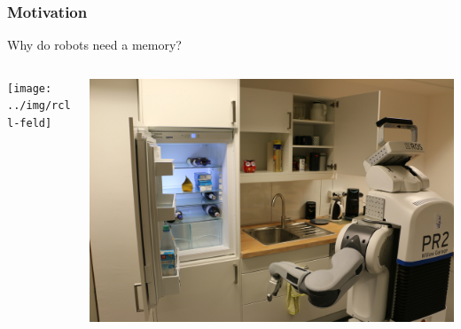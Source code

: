\begin{frame}
  \frametitle{Motivation}
  \Large{Why do robots need a memory?}
  \vspace{1cm}
  \begin{columns}
    \begin{column}{0.5\textwidth}
    \texttt{[image: ../img/rcll-feld]}
    \end{column}
    \begin{column}{0.5\textwidth}
    \includegraphics[width=\textwidth]{../img/pr2-kbsg-kitchen}
    \end{column}
  \end{columns}
\end{frame}

